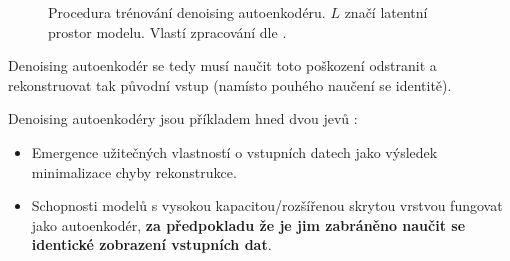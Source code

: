 \begin{figure}[H]
    \centering
    \caption{Procedura trénování denoising autoenkodéru. $L$ značí latentní prostor modelu. Vlastí zpracování dle \textcite{Goodfellow2016}.}
    \label{fig:denoising_autoencoder}
\end{figure}

Denoising autoenkodér se tedy musí naučit toto poškození odstranit a rekonstruovat tak původní vstup (namísto pouhého naučení se identitě).

Denoising autoenkodéry jsou příkladem hned dvou jevů \cite{Charte2018}:
\begin{itemize}
    \item Emergence užitečných vlastností o vstupních datech jako výsledek minimalizace chyby rekonstrukce.
    \item Schopnosti modelů s vysokou kapacitou/rozšířenou skrytou vrstvou fungovat jako autoenkodér, \textbf{za předpokladu že je jim zabráněno naučit se identické zobrazení vstupních dat}.
\end{itemize}